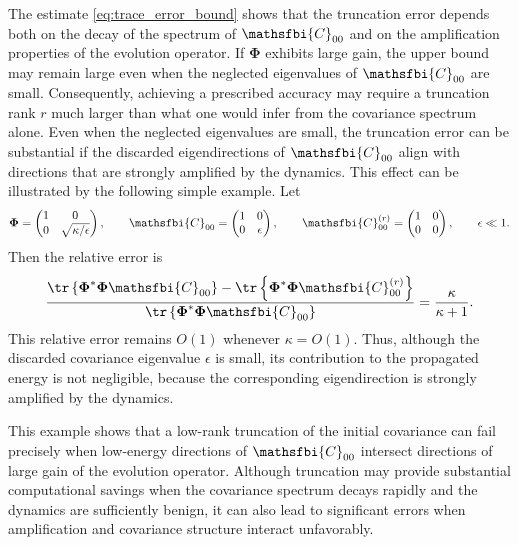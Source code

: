 \begin{appendices}
The estimate \eqref{eq:trace_error_bound} shows that the truncation error depends both on the decay of the spectrum of \(\mathsfbi{C}_{00}\) and on the amplification properties of the evolution operator. If \(\boldsymbol{\Phi}\) exhibits large gain, the upper bound may remain large even when the neglected eigenvalues of \(\mathsfbi{C}_{00}\) are small. Consequently, achieving a prescribed accuracy may require a truncation rank \(r\) much larger than what one would infer from the covariance spectrum alone.
Even when the neglected eigenvalues are small, the truncation error can be substantial if the discarded eigendirections of \(\mathsfbi{C}_{00}\) align with directions that are strongly amplified by the dynamics. This effect can be illustrated by the following simple example. Let
\begin{equation}
  \boldsymbol{\Phi}
  =
  \begin{pmatrix}
    1 & 0 \\
    0 & \sqrt{\kappa/\epsilon}
  \end{pmatrix},
  \qquad
  \mathsfbi{C}_{00}
  =
  \begin{pmatrix}
    1 & 0 \\
    0 & \epsilon
  \end{pmatrix},
  \qquad
  \mathsfbi{C}_{00}^{(r)}
  =
  \begin{pmatrix}
    1 & 0 \\
    0 & 0
  \end{pmatrix},
  \qquad
  \epsilon \ll 1 .
  \label{eq:low_rank_failure_example}
\end{equation}
Then the relative error is
\begin{equation}
  \frac{
    \tr
    \left\{
      \boldsymbol{\Phi}^{*}
      \boldsymbol{\Phi}
      \mathsfbi{C}_{00}
    \right\}
    -
    \tr
    \left\{
      \boldsymbol{\Phi}^{*}
      \boldsymbol{\Phi}
      \mathsfbi{C}_{00}^{(r)}
    \right\}
  }{
    \tr
    \left\{
      \boldsymbol{\Phi}^{*}
      \boldsymbol{\Phi}
      \mathsfbi{C}_{00}
    \right\}
  }
  =
  \frac{\kappa}{\kappa+1}.
  \label{eq:low_rank_failure_relative_error}
\end{equation}
This relative error remains \(O(1)\) whenever \(\kappa=O(1)\). Thus, although the discarded covariance eigenvalue \(\epsilon\) is small, its contribution to the propagated energy is not negligible, because the corresponding eigendirection is strongly amplified by the dynamics.

This example shows that a low-rank truncation of the initial covariance can fail precisely when low-energy directions of \(\mathsfbi{C}_{00}\) intersect directions of large gain of the evolution operator. Although truncation may provide substantial computational savings when the covariance spectrum decays rapidly and the dynamics are sufficiently benign, it can also lead to significant errors when amplification and covariance structure interact unfavorably.


\end{appendices}
